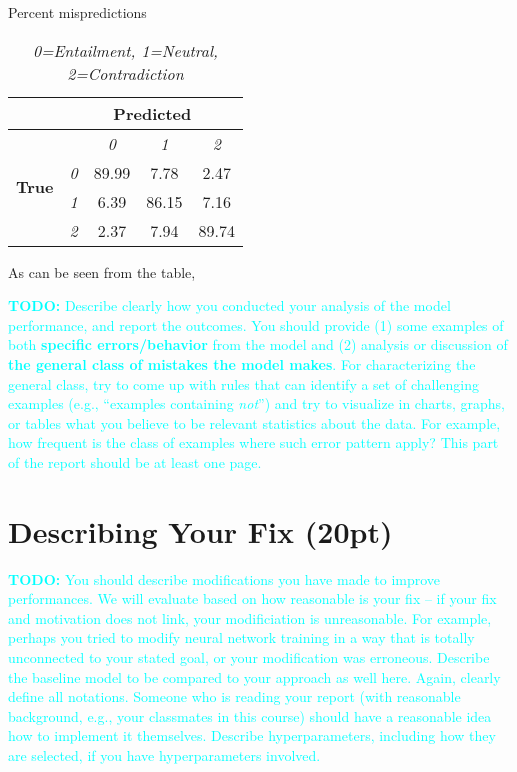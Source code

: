 \documentclass[twocolumn]{article}
\newcommand{\todo}[1]{\textcolor{cyan}{\textbf{TODO:} #1}}
\begin{document}
\begin{table}[]
\caption{Percent mispredictions}
\begin{tabular}{|l|cccc|}
\hline
                               & \multicolumn{4}{c|}{\textbf{Predicted}}                                                                          \\ \hline
\multirow{4}{*}{\textbf{True}} & \multicolumn{1}{l|}{}           & \multicolumn{1}{c|}{\textit{0}} & \multicolumn{1}{c|}{\textit{1}} & \textit{2} \\ \cline{2-5} 
                               & \multicolumn{1}{c|}{\textit{0}} & \multicolumn{1}{c|}{89.99}      & \multicolumn{1}{c|}{7.78}       & 2.47       \\ \cline{2-5} 
                               & \multicolumn{1}{c|}{\textit{1}} & \multicolumn{1}{c|}{6.39}       & \multicolumn{1}{c|}{86.15}      & 7.16       \\ \cline{2-5} 
                               & \multicolumn{1}{c|}{\textit{2}} & \multicolumn{1}{c|}{2.37}       & \multicolumn{1}{c|}{7.94}       & 89.74      \\ \hline
\end{tabular}
\caption*{\textit{ 0=Entailment, 1=Neutral, 2=Contradiction }}
\end{table}

As can be seen from the table, 


\todo{Describe clearly how you conducted your analysis of the model
performance, and report the outcomes. You should provide (1) some examples of
both \textbf{specific errors/behavior} from the model and (2) analysis or
discussion of \textbf{the general class of mistakes the model makes}. For
characterizing the general class, try to come up with rules that can identify a
set of challenging examples (e.g., ``examples containing \emph{not}'') and try
to visualize in charts, graphs, or tables what you believe to be relevant
statistics about the data. For example, how frequent is the class of examples
where such error pattern apply? This part of the report should be at least one
page.}

\section{Describing Your Fix (20pt)}


\todo{You should describe modifications you have made to improve performances.
We will evaluate based on how reasonable is your fix  -- if your fix and
motivation does not link, your modificiation is unreasonable. For example,
perhaps you tried to modify neural network training in a way that is totally
unconnected to your stated goal, or your modification was erroneous. Describe
the baseline model to be compared to your approach as well here. Again, clearly
define all notations. Someone who is reading your report (with reasonable
background, e.g., your classmates in this course) should have a reasonable idea
how to implement it themselves. Describe hyperparameters, including how they
are selected, if you have hyperparameters involved. }
\end{document}
